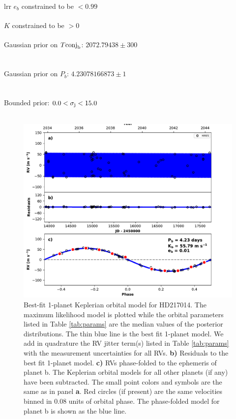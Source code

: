 \documentclass{emulateapj}
\begin{document}
\begin{deluxetable}{lrr}
\tablehead{}
\startdata
$e_{b}$ constrained to be $<0.99$ \\\\
$K$ constrained to be $>0$\\\\
Gaussian prior on $T\rm{conj}_{b}$: $2072.79438 \pm 300$ \\\\\\
Gaussian prior on $P_{b}$: $4.23078166873 \pm 1$ \\\\\\
Bounded prior: $0.0 < \sigma_{\rm j} < 15.0$\\\\

\enddata
\end{deluxetable}


\begin{figure}[!h]
\centering
\includegraphics[width=6.5in]{HD217014_rv_multipanel.pdf}
\caption{
Best-fit 1-planet Keplerian orbital model for HD217014.
The maximum likelihood model is plotted while the orbital parameters listed in Table \ref{tab:params}
are the median values of the posterior distributions.
The thin blue line is the best fit 1-planet model. We add in quadrature the RV jitter term(s) listed in Table \ref{tab:params}
with the measurement uncertainties for all RVs.
{\bf b)} Residuals to the best fit 1-planet model.
{\bf c)} RVs phase-folded to the ephemeris of planet b. The Keplerian orbital models for all other planets (if any) have been subtracted.
The small point colors and symbols are the same as in panel {\bf a}.
Red circles (if present) are the same velocities binned in 0.08 units of orbital phase.
The phase-folded model for planet b is shown as the blue line.
}
\end{figure}
\end{document}
